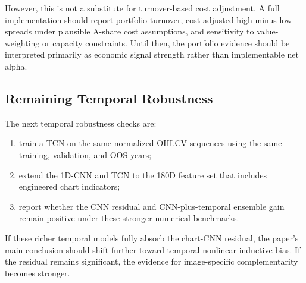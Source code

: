 However, this is not a substitute for turnover-based cost adjustment. A full implementation should report portfolio turnover, cost-adjusted high-minus-low spreads under plausible A-share cost assumptions, and sensitivity to value-weighting or capacity constraints. Until then, the portfolio evidence should be interpreted primarily as economic signal strength rather than implementable net alpha.

\subsection{Remaining Temporal Robustness}

The next temporal robustness checks are:
\begin{enumerate}
  \item train a TCN on the same normalized OHLCV sequences using the same training, validation, and OOS years;
  \item extend the 1D-CNN and TCN to the 180D feature set that includes engineered chart indicators;
  \item report whether the CNN residual and CNN-plus-temporal ensemble gain remain positive under these stronger numerical benchmarks.
\end{enumerate}
If these richer temporal models fully absorb the chart-CNN residual, the paper's main conclusion should shift further toward temporal nonlinear inductive bias. If the residual remains significant, the evidence for image-specific complementarity becomes stronger.
